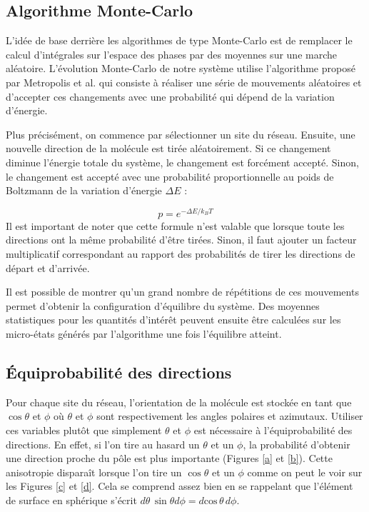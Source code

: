 \documentclass[11pt,a4paper]{article}
\numberwithin{equation}{section}
\begin{document}
\subsection{Algorithme Monte-Carlo}

L'idée de base derrière les algorithmes de type Monte-Carlo est de remplacer le calcul d'intégrales sur l'espace des phases par des moyennes sur une marche aléatoire. L'évolution Monte-Carlo de notre système utilise l'algorithme proposé par Metropolis et al. \cite{metropolis} qui consiste à réaliser une série de mouvements aléatoires et d'accepter ces changements avec une probabilité qui dépend de la variation d'énergie.\medskip

Plus précisément, on commence par sélectionner un site du réseau. Ensuite, une nouvelle direction de la molécule est tirée aléatoirement. Si ce changement diminue l'énergie totale du système, le changement est forcément accepté. Sinon, le changement est accepté avec une probabilité proportionnelle au poids de Boltzmann de la variation d'énergie $\Delta E$ :

\begin{equation}
p = e^{-\Delta E / k_B T}
\label{boltzmannprob}
\end{equation}
Il est important de noter que cette formule n'est valable que lorsque toute les directions ont la même probabilité d'être tirées. Sinon, il faut ajouter un facteur multiplicatif correspondant au rapport des probabilités de tirer les directions de départ et d'arrivée.
\medskip

Il est possible de montrer qu'un grand nombre de répétitions de ces mouvements permet d'obtenir la configuration d'équilibre du système. Des moyennes statistiques pour les quantités d'intérêt peuvent ensuite être calculées sur les micro-états générés par l'algorithme une fois l'équilibre atteint.

\subsection{Équiprobabilité des directions}
Pour chaque site du réseau, l'orientation de la molécule est stockée en tant que $\cos \theta$ et $\phi$ où $\theta$ et $\phi$ sont respectivement les angles polaires et azimutaux. Utiliser ces variables plutôt que simplement $\theta$ et $\phi$ est nécessaire à l'équiprobabilité des directions. En effet, si l'on tire au hasard un $\theta$ et un $\phi$, la probabilité d'obtenir une direction proche du pôle est plus importante (Figures \ref{a} et \ref{b}). Cette anisotropie disparaît lorsque l'on tire un $\cos \theta$ et un $\phi$ comme on peut le voir sur les Figures \ref{c} et \ref{d}. Cela se comprend assez bien en se rappelant que l'élément de surface en sphérique s'écrit $d\theta\, \sin \theta d\phi = d\text{cos}\,\theta\, d\phi$.
\end{document}
